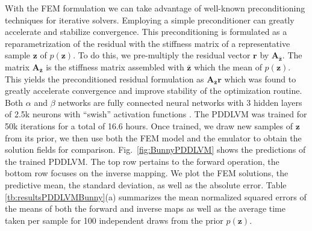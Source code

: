 \documentclass[11pt, fleqn]{article}
\def\A{{\mathbf A}}
\def\z{{\mathbf z}}
\def\r{{\mathbf r}}
\begin{document}
With the \gls*{FEM} formulation we can take advantage of well-known preconditioning techniques \cite{grote1997parallel} for iterative solvers. Employing a simple preconditioner can greatly accelerate and stabilize convergence. This preconditioning is formulated as a reparametrization of the residual with the stiffness matrix of a representative sample $\z$ of $p(\z)$. To do this, we pre-multiply the residual vector $\r$ by ${\A}_{\bar{\z}}$. The matrix ${\A}_{\bar{\z}}$ is the stiffness matrix assembled with $\bar{\z}$ which the mean of $p(\z)$. This yields the preconditioned residual formulation as ${\A}_{\bar{\z}}\r$ which was found to greatly accelerate convergence and improve stability of the optimization routine. Both $\alpha$ and $\beta$ networks are fully connected neural networks with 3 hidden layers of 2.5k neurons with ``swish'' activation functions \cite{ramachandran2017searching}. The \gls*{PDDLVM} was trained for 50k iterations for a total of 16.6 hours. Once trained, we draw new samples of $\z$ from its prior, we then use both the \gls*{FEM} model and the emulator to obtain the solution fields for comparison. Fig.~\ref{fig:BunnyPDDLVM} shows the predictions of the trained \gls*{PDDLVM}. The top row pertains to the forward operation, the bottom row focuses on the inverse mapping. We plot the \gls*{FEM} solutions, the predictive mean, the standard deviation, as well as the absolute error. Table \ref{tb:resultsPDDLVMBunny}(a) summarizes the mean normalized squared errors of the means of both the forward and inverse maps as well as the average time taken per sample for 100 independent draws from the prior $p(\z)$.
\end{document}
